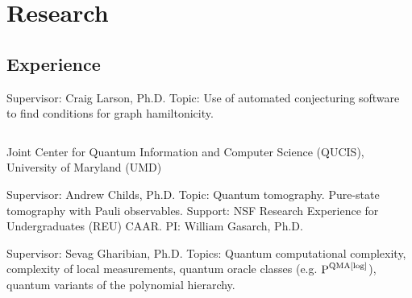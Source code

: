 \documentclass[11pt,letterpaper]{moderncv}
\begin{document}
\section{Research}
\subsection{Experience}
{	
	\begin{adjustwidth}{.25in}{}
		Supervisor: Craig Larson, Ph.D. \newline
		Topic: Use of automated conjecturing software to find conditions for graph hamiltonicity.
	\end{adjustwidth}
}

{
	$\!$\begin{minipage}{0.8\textwidth}
		Joint Center for Quantum Information and Computer Science (QUCIS), \newline
		University of Maryland (UMD)	
	\end{minipage}
}
{}{}
{	
	\begin{adjustwidth}{.25in}{}
		Supervisor: Andrew Childs, Ph.D. \newline
		Topic: Quantum tomography. Pure-state tomography with Pauli observables. \newline
		Support: NSF Research Experience for Undergraduates (REU)  CAAR. PI: William Gasarch, Ph.D.
	\end{adjustwidth}
}

{	
	\begin{adjustwidth}{.25in}{}
		Supervisor: Sevag Gharibian, Ph.D. \newline
		Topics: Quantum computational complexity, complexity of local measurements, quantum oracle classes (e.g. $\textup{P}^{\textup{QMA}[\log]}$), quantum variants of the polynomial hierarchy.
	\end{adjustwidth}
}


\printbibliography[heading=subbibliography, title={Pre-prints}, keyword=preprint]


\end{document}
